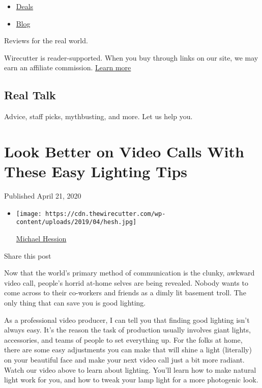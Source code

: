 \begin{itemize}
\tightlist
\item
  \href{/wirecutter/deals/}{Deals}
\item
  \href{/wirecutter/blog/}{Blog}
\end{itemize}

Reviews for the real world.

Wirecutter is reader-supported. When you buy through links on our site,
we may earn an affiliate commission. \href{/wirecutter/about/}{Learn
more}

\hypertarget{real-talk}{%
\subsection{Real Talk}\label{real-talk}}

Advice, staff picks, mythbusting, and more. Let us help you.

\hypertarget{look-better-on-video-calls-with-these-easy-lighting-tips}{%
\section{Look Better on Video Calls With These Easy Lighting
Tips}\label{look-better-on-video-calls-with-these-easy-lighting-tips}}

Published April 21, 2020

\begin{itemize}
\item
  \texttt{[image: https://cdn.thewirecutter.com/wp-content/uploads/2019/04/hesh.jpg]}

  \href{https://www.nytimes.com/wirecutter/authors/michael/}{Michael
  Hession}
\end{itemize}

Share this post

Now that the world's primary method of communication is the clunky,
awkward video call, people's horrid at-home selves are being revealed.
Nobody wants to come across to their co-workers and friends as a dimly
lit basement troll. The only thing that can save you is good lighting.

As a professional video producer, I can tell you that finding good
lighting isn't always easy. It's the reason the task of production
usually involves giant lights, accessories, and teams of people to set
everything up. For the folks at home, there are some easy adjustments
you can make that will shine a light (literally) on your beautiful face
and make your next video call just a bit more radiant. Watch our video
above to learn about lighting. You'll learn how to make natural light
work for you, and how to tweak your lamp light for a more photogenic
look.

